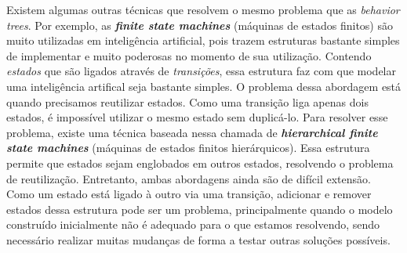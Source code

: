 Existem algumas outras técnicas que resolvem o mesmo problema que as
\textit{behavior trees}. Por exemplo, as \textbf{\textit{finite state
machines}} (máquinas de estados finitos) são muito utilizadas em inteligência
artificial, pois trazem estruturas bastante simples de implementar e muito
poderosas no momento de sua utilização. Contendo \textit{estados} que são ligados
através de \textit{transições}, essa estrutura faz com que modelar uma
inteligência artifical seja bastante simples. O problema dessa abordagem está
quando precisamos reutilizar estados. Como uma transição liga apenas dois
estados, é impossível utilizar o mesmo estado sem duplicá-lo. Para resolver
esse problema, existe uma técnica baseada nessa chamada de
\textbf{\textit{hierarchical finite state machines}} (máquinas de estados
finitos hierárquicos). Essa estrutura permite que estados sejam englobados em
outros estados, resolvendo o problema de reutilização.
Entretanto, ambas abordagens ainda são de difícil extensão. Como um estado está
ligado à outro via uma transição, adicionar e remover estados dessa estrutura
pode ser um problema, principalmente quando o modelo construído inicialmente
não é adequado para o que estamos resolvendo, sendo necessário realizar muitas
mudanças de forma a testar outras soluções possíveis.
